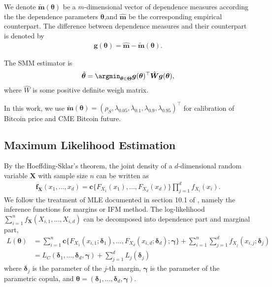 We denote $\tilde{\bm{m}}(\bm{\theta})$ be a $m$-dimensional vector of dependence measures according the the
dependence parameters $\bm{\theta}$,and  $\hat{\bm{m}}$ be the corresponding empirical counterpart.
The difference between dependence measures and their counterpart is denoted by
\begin{align*}
    \bm{g}(\bm{\theta}) = \hat{\bm{m}} - \tilde{\bm{m}}(\bm{\theta}).
\end{align*}\medskip

The SMM estimator is
\begin{align*}
    \hat{\bm{\theta}} = \argmin_{\bm{\theta}\in \bm{\Theta}} \bm{g}(\bm{\theta})^\top
    \hat{\bm{W}}
     \bm{g}(\bm{\theta}),
\end{align*}
where $\hat{W}$ is some positive definite weigh matrix.\medskip

In this work, we use $\tilde{\bm{m}}(\bm{\theta}) = (\rho_S, \lambda_{0.05}, \lambda_{0.1},
\lambda_{0.9}, \lambda_{0.95})^\top$
for calibration of Bitcoin price and CME Bitcoin future.

\subsection{Maximum Likelihood Estimation}\label{subsec:maximum-likelihood-estimation}
By the Hoeffding-Sklar's theorem, the joint density of a $d$-dimensional random variable $\bm{X}$ with sample size $n$ can be written as
\begin{align}
    \bm{f}_{\bm{X}}(x_1, ..., x_d) = \bm{c}\{F_{X_1}(x_1), ..., F_{X_d}(x_d)\} \prod_{j=1}^d f_{X_i}(x_i).
    \end{align}
We follow the treatment of MLE documented in section 10.1 of \citet{joe1997multivariate}, namely the inference functions for margins or IFM method.
The log-likelihood $\sum^n_{i=1}f_{\bm{X}}(X_{i,1}, ..., X_{i,d})$ can be decomposed into dependence part and marginal part,
\begin{align}
    L(\bm{\theta}) &= \sum_{i=1}^n \bm{c}\{F_{X_1}(x_{i,1};\bm{\delta}_1), ..., F_{X_d}(x_{i,d}; \bm{\delta}_d);\bm{\gamma}\}
    + \sum_{i=1}^n \sum_{j=1}^d f_{X_j}(x_{i,j};\bm{\delta}_j)\\
    &= L_C(\bm{\delta}_1, ..., \bm{\delta}_d, \bm{\gamma}) + \sum_{j=1}^d L_j(\bm{\delta}_j)
    \end{align}
where $\bm{\delta}_j$ is the parameter of the $j$-th margin, $\bm{\gamma}$ is the parameter of the parametric copula, and
$\bm{\theta} = (\bm{\delta}_1,..., \bm{\delta}_d, \bm{\gamma})$.

